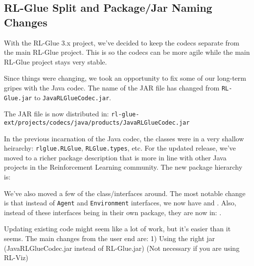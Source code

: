 \documentclass[11pt]{article}
\begin{document}
\subsection{RL-Glue Split and Package/Jar Naming Changes}
With the RL-Glue 3.x project, we've decided to keep the codecs separate from the main RL-Glue project.  This is so the codecs can be more agile while the main RL-Glue project stays very stable.

Since things were changing, we took an opportunity to fix some of our long-term gripes with the Java codec.  The name of the JAR file has changed from \texttt{RL-Glue.jar} to \texttt{JavaRLGlueCodec.jar}.

The JAR file is now distributed in:\newline
\texttt{rl-glue-ext/projects/codecs/java/products/JavaRLGlueCodec.jar}

In the previous incarnation of the Java codec, the classes were in a very shallow heirarchy: \texttt{rlglue.RLGlue}, \texttt{RLGlue.types}, etc.  For the updated release, we've moved to a richer package description that
is more in line with other Java projects in the Reinforcement Learning community.  The new package hierarchy is:\newline
{}

We've also moved a few of the class/interfaces around.  The most notable change is that instead of \texttt{Agent} and \texttt{Environment} interfaces, we now have 
 and 
.
Also, instead of these interfaces being in their own package, they are now in: . 



Updating existing code might seem like a lot of work, but it's easier than it seems.  The main changes from the user end are:
1) Using the right jar (JavaRLGlueCodec.jar instead of RL-Glue.jar)  (Not necessary if you are using RL-Viz)
\end{document}
